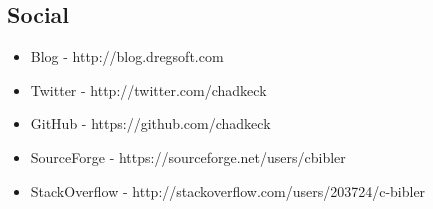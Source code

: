 \documentclass[margin]{res}
\begin{document}
\begin{resume}
\section{Social}
\begin{itemize} \itemsep -2pt  %

\item Blog - http://blog.dregsoft.com
\item Twitter - http://twitter.com/chadkeck
\item GitHub - https://github.com/chadkeck
\item SourceForge - https://sourceforge.net/users/cbibler
\item StackOverflow - http://stackoverflow.com/users/203724/c-bibler
\end{itemize}






 
\end{resume} 
\end{document}

